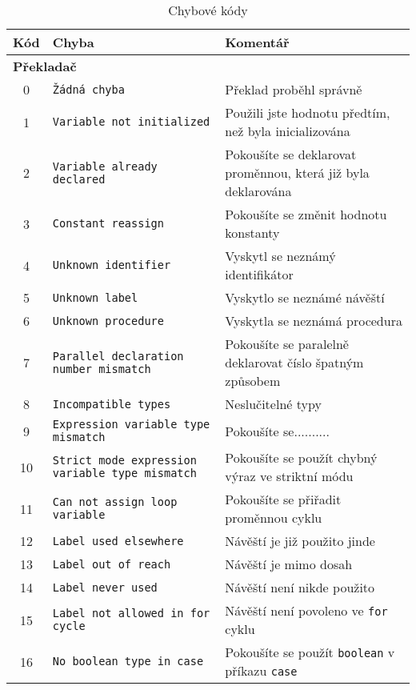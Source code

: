 \documentclass[
12pt,
a4paper,
pdftex,
czech
]{report}
\begin{document}
\begin{longtable}{|c|p{5.5cm}|p{6.5cm}|}
\caption{Chybové kódy}
\label{chyby}
\endfirsthead
\endhead
\hline
		\textbf{Kód} & \textbf{Chyba} & \textbf{Komentář} \\
\hline\hline
\multicolumn{3}{|l|}{\textbf{Překladač}}\\ \hline
\rule{0pt}{3ex}0 & \texttt{Žádná chyba} & Překlad proběhl správně \\ \hline
\rule{0pt}{3ex}1 & \texttt{Variable not initialized} & Použili jste hodnotu předtím, než byla inicializována \\ \hline
\rule{0pt}{3ex}2 & \texttt{Variable already declared} & Pokoušíte se deklarovat proměnnou, která již byla deklarována \\ \hline
\rule{0pt}{3ex}3 & \texttt{Constant reassign} & Pokoušíte se  změnit hodnotu konstanty \\ \hline
\rule{0pt}{3ex}4 & \texttt{Unknown identifier} & Vyskytl se neznámý identifikátor \\ \hline
\rule{0pt}{3ex}5 & \texttt{Unknown label} & Vyskytlo se neznámé návěští \\ \hline
\rule{0pt}{3ex}6 & \texttt{Unknown procedure} & Vyskytla se neznámá procedura \\ \hline
\rule{0pt}{3ex}7 & \texttt{Parallel declaration number mismatch} & Pokoušíte se paralelně deklarovat číslo špatným způsobem\\ \hline
\rule{0pt}{3ex}8 & \texttt{Incompatible types} & Neslučitelné typy \\ \hline
\rule{0pt}{3ex}9 & \texttt{Expression variable type mismatch} & Pokoušíte se.......... \\ \hline
\rule{0pt}{3ex}10 & \texttt{Strict mode expression variable type mismatch} & Pokoušíte se použít chybný výraz ve striktní módu \\ \hline
\rule{0pt}{3ex}11 & \texttt{Can not assign loop variable} & Pokoušíte se přiřadit proměnnou cyklu \\ \hline
\rule{0pt}{3ex}12 & \texttt{Label used elsewhere} & Návěští je již použito jinde \\ \hline
\rule{0pt}{3ex}13 & \texttt{Label out of reach} & Návěští je mimo dosah \\ \hline
\rule{0pt}{3ex}14 & \texttt{Label never used} & Návěští není nikde použito \\ \hline
\rule{0pt}{3ex}15 & \texttt{Label not allowed in for cycle} & Návěští není povoleno ve \texttt{for} cyklu \\ \hline
\rule{0pt}{3ex}16 & \texttt{No boolean type in case} & Pokoušíte se použít \texttt{boolean} v příkazu \texttt{case} \\ \hline

\end{longtable}
\end{document}

